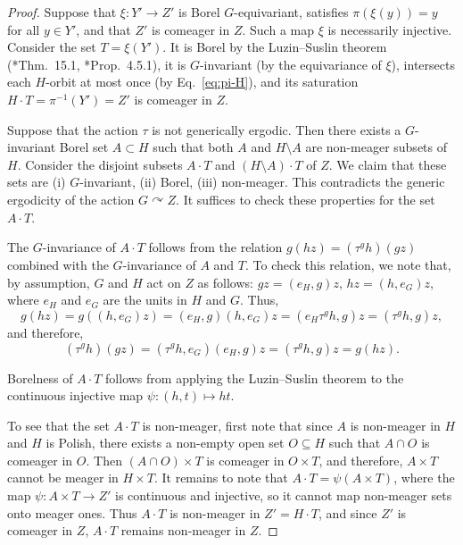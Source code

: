 \documentclass[12pt]{paper}
\numberwithin{equation}{section}
\theoremstyle{plain}
\theoremstyle{definition}
\newcommand{\acts}{\curvearrowright}
\begin{document}
\begin{proof}
  Suppose that \(\xi : Y' \to Z'\) is Borel \(G\)-equivariant, satisfies \(\pi(\xi(y)) = y\) for all
  \(y \in Y'\), and that \(Z'\) is comeager in \(Z\).  Such a map \(\xi\) is necessarily injective.
  Consider the set \(T=\xi(Y')\). It is Borel by the Luzin--Suslin theorem (\cite{Kechris}*{Thm.\
    15.1}, \cite{MR1619545}*{Prop.~4.5.1}), it is \(G\)-invariant (by the equivariance of \(\xi\)),
  intersects each \(H\)-orbit at most once (by Eq.~\eqref{eq:pi-H}), and its saturation
  \(H \cdot T = \pi^{-1}(Y') = Z'\) is comeager in \(Z\).

  Suppose that the action \(\tau\) is not generically ergodic.  Then there exists a \(G\)-invariant
  Borel set \(A\subset H\) such that both \(A\) and \(H\setminus A\) are non-meager subsets of
  \(H\).  Consider the disjoint subsets \(A\cdot T\) and \((H\setminus A)\cdot T\) of \(Z\). We
  claim that these sets are (i) \(G\)-invariant, (ii) Borel, (iii) non-meager. This contradicts the
  generic ergodicity of the action \(G \acts Z\).  It suffices to check these properties for the set
  \(A\cdot T\).

  The \(G\)-invariance of \(A\cdot T\) follows from the relation \(g(hz)=(\tau^g h)(gz)\) combined
  with the \(G\)-invariance of \(A\) and \(T\).  To check this relation, we note that, by
  assumption, \(G\) and \(H\) act on \(Z\) as follows: \(gz=(e_H, g)z\), \(hz=(h, e_G)z\), where
  \(e_H\) and \(e_G\) are the units in \(H\) and \(G\). Thus,
  \[ g(hz)=g((h, e_G)z)=(e_H, g)(h, e_G)z=(e_H \tau^g h, g)z = (\tau^g h, g)z, \] and therefore,
  \[
    (\tau^g h)(gz) = (\tau^g h, e_G)(e_H, g)z = (\tau^g h, g)z = g(hz).
  \]


  Borelness of \(A\cdot T\) follows from applying the Luzin--Suslin theorem to the continuous
  injective map \(\psi\colon (h, t)\mapsto ht\).

  To see that the set \(A\cdot T\) is non-meager, first note that since \(A\) is non-meager in \(H\)
  and \(H\) is Polish, there exists a non-empty open set \(O\subseteq H\) such that \(A\cap O\) is
  comeager in \(O\).  Then \((A\cap O)\times T\) is comeager in \(O\times T\), and therefore,
  \(A \times T\) cannot be meager in \(H\times T\). It remains to note that
  \(A\cdot T = \psi (A\times T)\), where the map \(\psi\colon A\times T \to Z'\) is continuous and
  injective, so it cannot map non-meager sets onto meager ones. Thus \(A\cdot T\) is non-meager in
  \(Z'=H\cdot T\), and since \(Z'\) is comeager in \(Z\), \(A\cdot T\) remains non-meager in \(Z\).
\end{proof}
\end{document}
